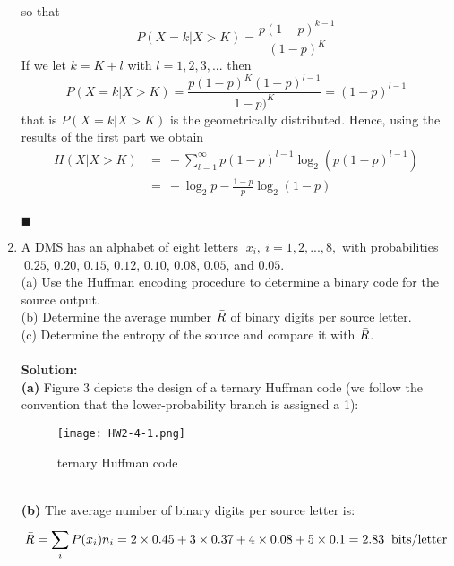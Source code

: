 \documentclass[a4paper,12pt]{article}
\begin{document}
\begin{enumerate}
\begin{align*}
            \end{align*}
            so that $$P(X = k | X > K) = \frac{p(1 - p)^{k - 1}}{(1 - p)^K}$$
            If we let $k = K + l$ with $l = 1, 2, 3, ...$ then $$P(X = k | X > K) = \frac{p(1 - p)^K (1 - p)^{l - 1}}{1 - p)^K} = (1 - p)^{l - 1}$$
            that is $P(X = k | X > K)$ is the geometrically distributed. Hence, using the results of the first part we obtain 
            \begin{align*}
                H(X | X > K) &= \ - \sum_{l = 1}^{\infty} p(1 - p)^{l - 1} \log_2 \left( p(1 - p)^{l - 1} \right) \\
                             &= \ - \log_2 p - \frac{1 - p}{p} \log_2 \left(1 - p\right) \\
            \end{align*}
            \begin{flushright}
                $\blacksquare$
            \end{flushright}
        \item 
            A DMS has an alphabet of eight letters $\; x_i, \ i = 1, 2,..., 8,$ with probabilities $\ 0.25$, $0.20$, $0.15$, $0.12$, $0.10$, $0.08$, $0.05$, and $0.05$. \\
            (a) Use the Huffman encoding procedure to determine a binary code for the source output. \\ 
            (b) Determine the average number $\Bar{R}$ of binary digits per source letter. \\ 
            (c) Determine the entropy of the source and compare it with $\Bar{R}$. \\ \\ 
            \textbf{Solution:} \\
            \textbf{(a)} 
            Figure 3 depicts the design of a ternary Huffman code (we follow the convention that the lower-probability branch is assigned a 1):
            \begin{figure}[h]
                \centering
                \texttt{[image: HW2-4-1.png]}
                \caption{ternary Huffman code}
            \end{figure} \\ 
            \textbf{(b)} 
            The average number of binary digits per source letter is: $$\Bar{R} = \sum_{i}^{}P(x_{i})n_{i} = 2 \times 0.45 + 3 \times 0.37 + 4 \times 0.08 + 5 \times 0.1 = 2.83 \;\; \text{bits/letter}$$

\end{enumerate}
\end{document}
